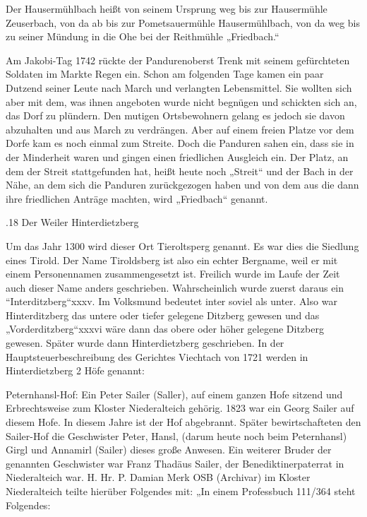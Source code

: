 \documentclass{book}
\begin{document}
Der Hausermühlbach heißt von seinem Ursprung weg bis zur Hausermühle Zeuserbach,
von da ab bis zur Pometsauermühle Hausermühlbach, von da weg bis zu seiner
Mündung in die Ohe bei der Reithmühle „Friedbach.“

Am Jakobi-Tag 1742 rückte der Pandurenoberst Trenk mit seinem gefürchteten
Soldaten im Markte Regen ein. Schon am folgenden Tage kamen ein paar Dutzend
seiner Leute nach March und verlangten Lebensmittel. Sie wollten sich aber mit
dem, was ihnen angeboten wurde nicht begnügen und schickten sich an, das Dorf zu
plündern. Den mutigen Ortsbewohnern gelang es jedoch sie davon abzuhalten und
aus March zu verdrängen. Aber auf einem freien Platze vor dem Dorfe kam es noch
einmal zum Streite. Doch die Panduren sahen ein, dass sie in der Minderheit
waren und gingen einen friedlichen Ausgleich ein. Der Platz, an dem der Streit
stattgefunden hat, heißt heute noch „Streit“ und der Bach in der Nähe, an dem
sich die Panduren zurückgezogen haben und von dem aus die dann ihre friedlichen
Anträge machten, wird „Friedbach“ genannt.

.18 Der Weiler Hinterdietzberg

Um das Jahr 1300 wird dieser Ort Tieroltsperg genannt. Es war dies die Siedlung
eines Tirold. Der Name Tiroldsberg ist also ein echter Bergname, weil er mit
einem Personennamen zusammengesetzt ist. Freilich wurde im Laufe der Zeit auch
dieser Name anders geschrieben. Wahrscheinlich wurde zuerst daraus ein
“Interditzberg“xxxv. Im Volksmund bedeutet inter soviel als unter. Also war
Hinterditzberg das untere oder tiefer gelegene Ditzberg gewesen und das
„Vorderditzberg“xxxvi wäre dann das obere oder höher gelegene Ditzberg gewesen.
Später wurde dann Hinterdietzberg geschrieben. In der Hauptsteuerbeschreibung
des Gerichtes Viechtach von 1721 werden in Hinterdietzberg 2 Höfe genannt:

Peternhansl-Hof: Ein Peter Sailer (Saller), auf einem ganzen Hofe sitzend und
Erbrechtsweise zum Kloster Niederalteich gehörig. 1823 war ein Georg Sailer auf
diesem Hofe. In diesem Jahre ist der Hof abgebrannt. Später bewirtschafteten den
Sailer-Hof die Geschwister Peter, Hansl, (darum heute noch beim Peternhansl)
Girgl und Annamirl (Sailer) dieses große Anwesen. Ein weiterer Bruder der
genannten Geschwister war Franz Thadäus Sailer, der Benediktinerpaterrat in
Niederalteich war. H. Hr. P. Damian Merk OSB (Archivar) im Kloster Niederalteich
teilte hierüber Folgendes mit: „In einem Professbuch 111/364 steht Folgendes:
\end{document}
